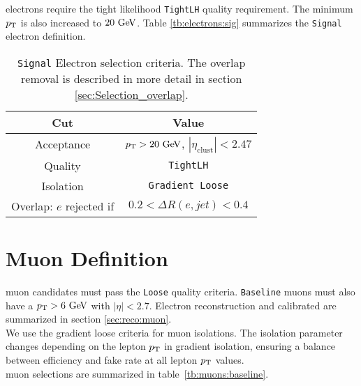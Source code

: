  electrons require the tight likelihood {\tt TightLH} quality requirement.  The minimum $p_{\mathrm{T}}$ is also increased to $20 \gev$.  Table \ref{tb:electrons:sig} summarizes the {\tt Signal} electron definition. \\

\begin{table}[htp]
  \begin{center}
    \begin{tabular}{c|c} \hline \hline
      Cut & Value \\ \hline \hline
      Acceptance & $\pT > 20 \gev$, $|\eta_{\mathrm{clust}}| < 2.47$ \\ \hline
      Quality & {\tt TightLH} \\ \hline
      Isolation & {\tt Gradient Loose} \\ \hline
      Overlap: $e$ rejected if &  $0.2 < \Delta R(e,jet) < 0.4$\\ \hline%
      \hline
    \end{tabular}
  \caption{{\tt Signal} Electron selection criteria. The overlap removal is described in more detail in section \ref{sec:Selection_overlap}.}
  \end{center}
  \label{tb:electrons}
\end{table}%

\section{Muon Definition}  \label{sec:MuonDef}

 muon candidates must pass the {\tt Loose} quality criteria.  {\tt Baseline} muons must also have a $\pT > 6 \gev$ with $|\eta| < 2.7$.  Electron reconstruction and calibrated are summarized in section \ref{sec:reco:muon}. \\

\indent We use the gradient loose criteria for muon isolations. The isolation parameter changes depending on the lepton $p_{\mathrm{T}}$ in gradient isolation, ensuring a balance between efficiency and fake rate at all lepton $p_{\mathrm{T}}$ values. \\

 muon selections are summarized in table~\ref{tb:muons:baseline}. \\  

